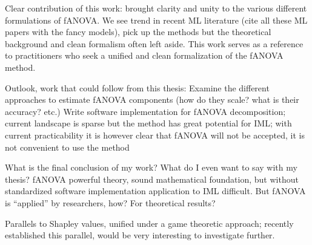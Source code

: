 Clear contribution of this work: brought clarity and unity to the various different formulations of fANOVA. We see trend in recent ML literature (cite all these ML papers with the fancy models), pick up the methods but the theoretical background and clean formalism often left aside. This work serves as a reference to practitioners who seek a unified and clean formalization of the fANOVA method. 

Outlook, work that could follow from this thesis:
Examine the different approaches to estimate fANOVA components (how do they scale? what is their accuracy? etc.)
Write software implementation for fANOVA decomposition; current landscape is sparse but the method has great potential for IML; with current practicability it is however clear that fANOVA will not be accepted, it is not convenient to use the method

What is the final conclusion of my work? What do I even want to say with my thesis?
fANOVA powerful theory, sound mathematical foundation, but without standardized software implementation application to IML difficult.
But fANOVA is ``applied'' by researchers, how? For theoretical results?

Parallels to Shapley values, unified under a game theoretic approach; \cite{fumagalli2025} recently established this parallel, would be very interesting to investigate further.

